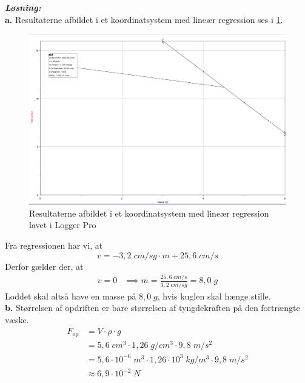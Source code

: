 \documentclass{report}
\newcommand{\sol}{\setlength{\parindent}{0cm}\textbf{\textit{Løsning:}}\setlength{\parindent}{1cm}}
\begin{document}
\sol \\
\textbf{a.}
Resultaterne afbildet i et koordinatsystem med lineær regression ses i \cref{fig:kugle}.
\begin{figure}[H]
\begin{center}
  \includegraphics[scale=0.3]{kugle.png}
\end{center}
\caption{Resultaterne afbildet i et koordinatsystem med lineær regression lavet i Logger Pro}
\label{fig:kugle}
\end{figure}
Fra regressionen har vi, at 
\[
v=-3,2 \;\unit{cm/sg} \cdot m + 25,6 \;\unit{cm/s} 
\] 
Derfor gælder der, at
\begin{equation*}
\begin{split}
  v=0 &\implies m=\frac{25,6 \;\unit{cm/s} }{3,2 \;\unit{cm/sg} } = 8,0 \;\unit{g} 
\end{split}
\end{equation*}
Loddet skal altså have en masse på $8,0 \;\unit{g} $, hvis kuglen skal hænge stille. \\[1ex]
\textbf{b.}
Størrelsen af opdriften er bare størrelsen af tyngdekraften på den fortrængte væske.
\begin{equation*}
\begin{split}
  F _{\text{op} }&=V \cdot \rho \cdot g\\
  &=5,6 \;\unit{cm^3} \cdot 1,26 \;\unit{g/cm^3} \cdot 9,8 \;\unit{m/s^2} \\
  &=5,6 \cdot 10^{-6} \;\unit{m^3} \cdot 1,26 \cdot 10^3 \;\unit{kg/m^3} \cdot 9,8 \;\unit{m/s^2} \\
  &\approx 6,9 \cdot 10 ^{-2} \;\unit{N} 
\end{split}
\end{equation*}
\end{document}
